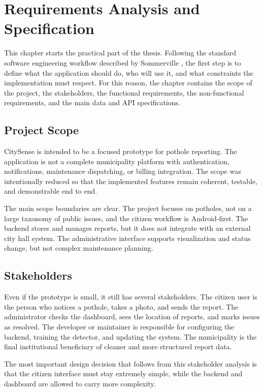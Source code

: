 \chapter{Requirements Analysis and Specification}

This chapter starts the practical part of the thesis. Following the standard software engineering workflow described by Sommerville \cite{sommerville2010}, the first step is to define what the application should do, who will use it, and what constraints the implementation must respect. For this reason, the chapter contains the scope of the project, the stakeholders, the functional requirements, the non-functional requirements, and the main data and API specifications.

\section{Project Scope}

CitySense is intended to be a focused prototype for pothole reporting. The application is not a complete municipality platform with authentication, notifications, maintenance dispatching, or billing integration. The scope was intentionally reduced so that the implemented features remain coherent, testable, and demonstrable end to end.

The main scope boundaries are clear. The project focuses on potholes, not on a large taxonomy of public issues, and the citizen workflow is Android-first. The backend stores and manages reports, but it does not integrate with an external city hall system. The administrative interface supports visualization and status change, but not complex maintenance planning.

\section{Stakeholders}

Even if the prototype is small, it still has several stakeholders. The citizen user is the person who notices a pothole, takes a photo, and sends the report. The administrator checks the dashboard, sees the location of reports, and marks issues as resolved. The developer or maintainer is responsible for configuring the backend, training the detector, and updating the system. The municipality is the final institutional beneficiary of cleaner and more structured report data.

The most important design decision that follows from this stakeholder analysis is that the citizen interface must stay extremely simple, while the backend and dashboard are allowed to carry more complexity.

